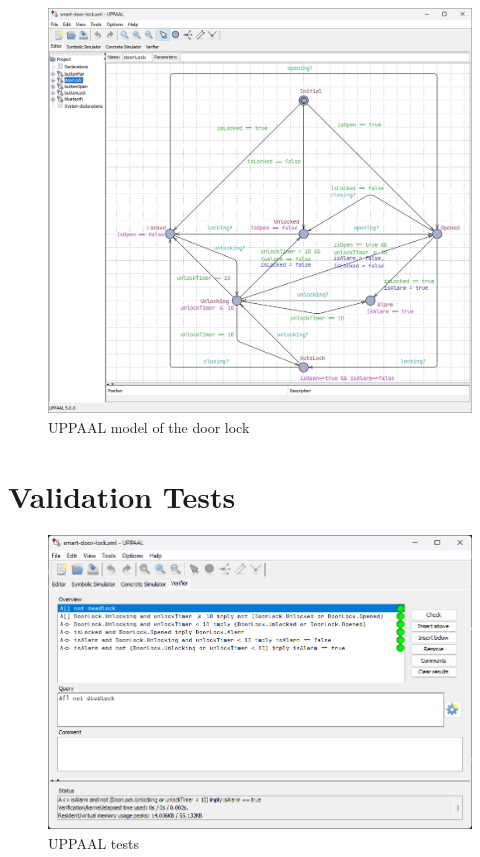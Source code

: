 \begin{figure}[tbh]
\includegraphics[width=.95\textwidth]{./../uppaal/doorLock.png}
\caption{UPPAAL model of the door lock}
\label{app:fig:UPPAALModelDoorLock}
\end{figure}

\section{Validation Tests}
\label{app:ValidationTests}

\begin{figure}[tbh]
\includegraphics[width=.95\textwidth]{./../uppaal/tests.png}
\caption{UPPAAL tests}
\label{app:fig:UPPAALTests}
\end{figure}

